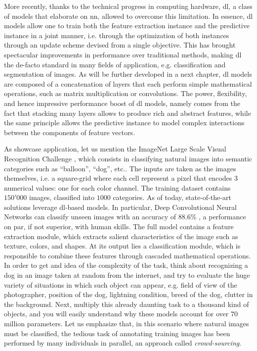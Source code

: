 More recently, thanks to the technical progress in computing hardware, \gls{dl}, a class of models that elaborate on \gls{nn}, allowed to overcome this limitation.
In essence, \gls{dl} models allow one to train both the feature extraction instance and the predictive instance in a joint manner, i.e. through the optimization of both instances through an update scheme devised from a single objective.
This has brought spectacular improvements in performance over traditional methods, making \gls{dl} the de-facto standard in many fields of application, e.g. classification and segmentation of images.
As will be further developed in a next chapter, \gls{dl} models are composed of a concatenation of layers that each perform simple mathematical operations, such as matrix multiplication or convolutions.
The power, flexibility, and hence impressive performance boost of \gls{dl} models, namely comes from the fact that stacking many layers allows to produce rich and abstract features, while the same principle allows the predictive instance to model complex interactions between the components of feature vectors.

As showcase application, let us mention the ImageNet Large Scale Visual Recognition Challenge \cite{ILSVRC15}, which consists in classifying natural images into semantic categories such as ``balloon'', ``dog'', etc..
The inputs are taken as the images themselves, i.e. a square-grid where each cell represent a pixel that encodes $3$ numerical values: one for each color channel.
The training dataset contains $150'000$ images, classified into $1000$ categories.
As of today, state-of-the-art solutions leverage \gls{dl}-based models.
In particular, Deep Convolutional Neural Networks can classify unseen images with an accuracy of $88.6\%$ \cite{tan19}, a performance on par, if not superior, with human skills.
The full model contains a feature extraction module, which extracts salient characteristics of the image such as texture, colors, and shapes.
At its output lies a classification module, which is responsible to combine these features through cascaded mathematical operations.
In order to get and idea of the complexity of the task, think about recognizing a dog in an image taken at random from the internet, and try to evaluate the huge variety of situations in which such object can appear, e.g. field of view of the photographer, position of the dog, lightning condition, breed of the dog, clutter in the background.
Next, multiply this already daunting task to a thousand kind of objects, and you will easily understand why these models account for over $70$ million parameters.
Let us emphasize that, in this scenario where natural images must be classified, the tedious task of annotating training images has been performed by many individuals in parallel, an approach called \textit{crowd-sourcing}.

